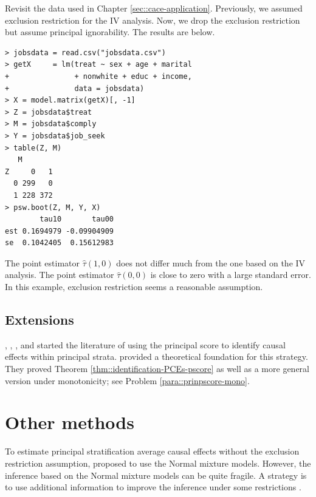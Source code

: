     
Revisit the data used in Chapter \ref{sec::cace-application}. Previously, we assumed exclusion restriction for the IV analysis. Now, we drop the exclusion restriction but assume principal ignorability. The results are below. 


 \begin{lstlisting}
> jobsdata = read.csv("jobsdata.csv")
> getX     = lm(treat ~ sex + age + marital 
+               + nonwhite + educ + income,
+               data = jobsdata)
> X = model.matrix(getX)[, -1]
> Z = jobsdata$treat
> M = jobsdata$comply
> Y = jobsdata$job_seek
> table(Z, M)
   M
Z     0   1
  0 299   0
  1 228 372
> psw.boot(Z, M, Y, X)
        tau10       tau00
est 0.1694979 -0.09904909
se  0.1042405  0.15612983
\end{lstlisting}
        

The point estimator       $\hat \tau(1,0) $ does not differ much from the one based on the   IV analysis. The point estimator $\hat \tau(0,0) $ is close to zero with a large standard error. In this example, exclusion restriction seems a reasonable assumption. 
        
               
    
\subsection{Extensions}

 
 
 
 \citet{follmann2000effect}, \citet{hill2002differential}, \citet{jo2009use}, \citet{jo2011use} and \citet{stuart2015assessing} started the literature of using the principal score to identify causal effects within principal strata. \citet{ding2017principal} provided a theoretical foundation for this strategy. They proved Theorem \ref{thm::identification-PCEs-pscore} as well as a more general version under monotonicity; see Problem \ref{para::prinpscore-mono}.  

 

\section{Other methods}


To estimate principal stratification average causal effects without the exclusion restriction assumption,  \citet{zhang2009likelihood} proposed to use the Normal mixture models. However,   the inference based on the Normal mixture models can be quite fragile. A strategy is to use additional information to improve the inference under some restrictions \citep{ding2011identifiability, mealli2013using, mattei2013exploiting, jiang2016principal}.  
 
